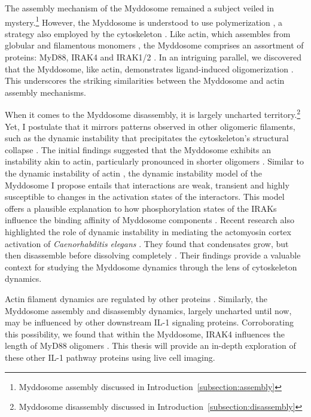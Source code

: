 The assembly mechanism of the Myddosome remained a subject veiled in mystery.\footnote{Myddosome assembly discussed in Introduction~\ref{subsection:assembly}} However, the Myddosome is understood to use polymerization \autocite{Lin_2010}, a strategy also employed by the cytoskeleton \autocite{Mogilner_1996}. Like actin, which assembles from globular and filamentous monomers \autocite{Cooper_2000}, the Myddosome comprises an assortment of proteins: MyD88, IRAK4 and IRAK1/2 \autocite{Lin_2010}. In an intriguing parallel, we discovered that the Myddosome, like actin, demonstrates ligand-induced oligomerization \autocite{Deliz-Aguirre_2021}. This underscores the striking similarities between the Myddosome and actin assembly mechanisms.
 
When it comes to the Myddosome disassembly, it is largely uncharted territory.\footnote{Myddosome disassembly discussed in Introduction~\ref{subsection:disassembly}} Yet, I postulate that it mirrors patterns observed in other oligomeric filaments, such as the dynamic instability that precipitates the cytoskeleton’s structural collapse \autocite{Mitchison_1984}. The initial findings suggested that the Myddosome exhibits an instability akin to actin, particularly pronounced in shorter oligomers \autocite{Deliz-Aguirre_2021}. Similar to the dynamic instability of actin \autocite{Kueh_2009}, the dynamic instability model of the Myddosome I propose entails that interactions are weak, transient and highly susceptible to changes in the activation states of the interactors. This model offers a plausible explanation to how phosphorylation states of the IRAKs influence the binding affinity of Myddosome components \autocite{DeNardo_2018}. Recent research also highlighted the role of dynamic instability in mediating the actomyosin cortex activation of \emph{Caenorhabditis elegans} \autocite{Yan_2022}. They found that condensates grow, but then disassemble before dissolving completely \autocite{Yan_2022}. Their findings provide a valuable context for studying the Myddosome dynamics through the lens of cytoskeleton dynamics.
 
Actin filament dynamics are regulated by other proteins \autocite{Lee_2010}\autocite{Kashina_2020}. Similarly, the Myddosome assembly and disassembly dynamics, largely uncharted until now, may be influenced by other downstream IL-1 signaling proteins. Corroborating this possibility, we found that within the Myddosome, IRAK4 influences the length of MyD88 oligomers \autocite{Deliz-Aguirre_2021}. This thesis will provide an in-depth exploration of these other IL-1 pathway proteins using live cell imaging.

